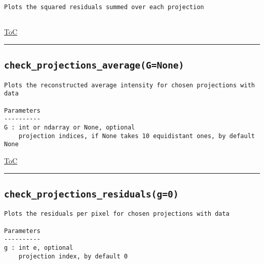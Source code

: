 \documentclass{article}
\begin{document}
\begin{lstlisting}[language=docstring]
Plots the squared residuals summed over each projection
    
\end{lstlisting}

\begin{flushright}

\hyperref[toc]{ToC}

\end{flushright}



\vspace{5mm}

\hrule

\subsection*{\texttt{check\_projections\_average(G=None)}}
\label{fun:checkprojectionsaverage}

\begin{lstlisting}[language=docstring]
Plots the reconstructed average intensity for chosen projections with data

Parameters
----------
G : int or ndarray or None, optional
    projection indices, if None takes 10 equidistant ones, by default None
\end{lstlisting}

\begin{flushright}

\hyperref[toc]{ToC}

\end{flushright}



\vspace{5mm}

\hrule

\subsection*{\texttt{check\_projections\_residuals(g=0)}}
\label{fun:checkprojectionsresiduals}

\begin{lstlisting}[language=docstring]
Plots the residuals per pixel for chosen projections with data

Parameters
----------
g : int e, optional
    projection index, by default 0
\end{lstlisting}
\end{document}
